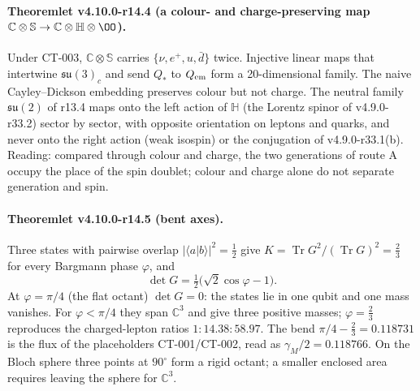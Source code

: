 \paragraph{Theoremlet v4.10.0-r14.4 (a colour- and charge-preserving map \(\mathbb C\otimes\mathbb S\to\mathbb C\otimes\mathbb H\otimes\OO\)).}
Under CT-003, \(\mathbb C\otimes\mathbb S\) carries \(\{\nu,e^+,u,\bar d\}\) twice.  Injective linear maps that intertwine
\(\mathfrak{su}(3)_c\) and send \(Q_*\) to \(Q_{\rm em}\) form a 20-dimensional family.  The naive Cayley--Dickson embedding
preserves colour but not charge.  The neutral family \(\mathfrak{su}(2)\) of r13.4 maps onto the left action of \(\mathbb H\) (the
Lorentz spinor of v4.9.0-r33.2) sector by sector, with opposite orientation on leptons and quarks, and never onto the right
action (weak isospin) or the conjugation of v4.9.0-r33.1(b).  Reading: compared through colour and charge, the two
generations of route A occupy the place of the spin doublet; colour and charge alone do not separate generation and spin.

\paragraph{Theoremlet v4.10.0-r14.5 (bent axes).}
Three states with pairwise overlap \(|\langle a|b\rangle|^2=\tfrac12\) give \(K=\operatorname{Tr}G^2/(\operatorname{Tr}G)^2=\tfrac23\)
for every Bargmann phase \(\varphi\), and
\[
\det G=\tfrac12\bigl(\sqrt2\cos\varphi-1\bigr).
\]
At \(\varphi=\pi/4\) (the flat octant) \(\det G=0\): the states lie in one qubit and one mass vanishes.  For \(\varphi<\pi/4\)
they span \(\mathbb C^3\) and give three positive masses; \(\varphi=\tfrac23\) reproduces the charged-lepton ratios
\(1:14.38:58.97\).  The bend \(\pi/4-\tfrac23=0.118731\) is the flux of the placeholders CT-001/CT-002, read as
\(\gamma_M/2=0.118766\).  On the Bloch sphere three points at \(90^\circ\) form a rigid octant; a smaller enclosed area requires
leaving the sphere for \(\mathbb C^3\).

